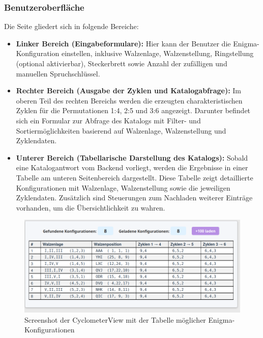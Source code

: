\documentclass[12pt, ngerman, a4paper, numbers=noenddot]{article}
\begin{document}
\subsubsection{Benutzeroberfläche}

Die Seite gliedert sich in folgende Bereiche:

\begin{itemize}
	\item \textbf{Linker Bereich (Eingabeformulare):}  
	Hier kann der Benutzer die Enigma-Konfiguration einstellen, inklusive Walzenlage, Walzenstellung, Ringstellung (optional aktivierbar), Steckerbrett sowie Anzahl der zufälligen und manuellen Spruchschlüssel.
	
	
	\newpage
	\item \textbf{Rechter Bereich (Ausgabe der Zyklen und Katalogabfrage):}  
	Im oberen Teil des rechten Bereichs werden die erzeugten charakteristischen Zyklen für die Permutationen 1:4, 2:5 und 3:6 angezeigt.  
	Darunter befindet sich ein Formular zur Abfrage des Katalogs mit Filter- und Sortiermöglichkeiten basierend auf Walzenlage, Walzenstellung und Zyklendaten.
	
	\item \textbf{Unterer Bereich (Tabellarische Darstellung des Katalogs):}  
	Sobald eine Katalogantwort vom Backend vorliegt, werden die Ergebnisse in einer Tabelle am unteren Seitenbereich dargestellt. Diese Tabelle zeigt detaillierte Konfigurationen mit Walzenlage, Walzenstellung sowie die jeweiligen Zyklendaten.  
	Zusätzlich sind Steuerungen zum Nachladen weiterer Einträge vorhanden, um die Übersichtlichkeit zu wahren.
\end{itemize}

	\begin{figure}[H]
	\centering
	\includegraphics[width=1\textwidth]{bilder/CyclometerView_Katalog.png}
	\caption{Screenshot der CyclometerView mit der Tabelle möglicher Enigma-Konfigurationen}
	\label{fig:CyclometerView_Katalog}
\end{figure}
\end{document}
